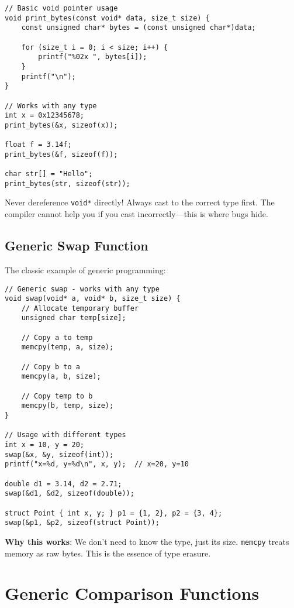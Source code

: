 \begin{lstlisting}
// Basic void pointer usage
void print_bytes(const void* data, size_t size) {
    const unsigned char* bytes = (const unsigned char*)data;

    for (size_t i = 0; i < size; i++) {
        printf("%02x ", bytes[i]);
    }
    printf("\n");
}

// Works with any type
int x = 0x12345678;
print_bytes(&x, sizeof(x));

float f = 3.14f;
print_bytes(&f, sizeof(f));

char str[] = "Hello";
print_bytes(str, sizeof(str));
\end{lstlisting}

\begin{warningbox}
Never dereference \texttt{void*} directly! Always cast to the correct type first. The compiler cannot help you if you cast incorrectly---this is where bugs hide.
\end{warningbox}

\subsection{Generic Swap Function}

The classic example of generic programming:

\begin{lstlisting}
// Generic swap - works with any type
void swap(void* a, void* b, size_t size) {
    // Allocate temporary buffer
    unsigned char temp[size];

    // Copy a to temp
    memcpy(temp, a, size);

    // Copy b to a
    memcpy(a, b, size);

    // Copy temp to b
    memcpy(b, temp, size);
}

// Usage with different types
int x = 10, y = 20;
swap(&x, &y, sizeof(int));
printf("x=%d, y=%d\n", x, y);  // x=20, y=10

double d1 = 3.14, d2 = 2.71;
swap(&d1, &d2, sizeof(double));

struct Point { int x, y; } p1 = {1, 2}, p2 = {3, 4};
swap(&p1, &p2, sizeof(struct Point));
\end{lstlisting}

\textbf{Why this works}: We don't need to know the type, just its size. \texttt{memcpy} treats memory as raw bytes. This is the essence of type erasure.

\section{Generic Comparison Functions}


